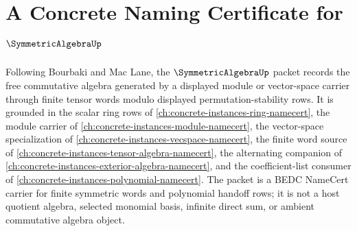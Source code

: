 \chapter{A Concrete Naming Certificate for $\SymmetricAlgebraUp$}
\label{ch:concrete-instances-symmetric-algebra-namecert}

Following Bourbaki and Mac Lane, the $\SymmetricAlgebraUp$ packet records the free commutative algebra generated by a displayed module or vector-space carrier through finite tensor words modulo displayed permutation-stability rows. It is grounded in the scalar ring rows of \autoref{ch:concrete-instances-ring-namecert}, the module carrier of \autoref{ch:concrete-instances-module-namecert}, the vector-space specialization of \autoref{ch:concrete-instances-vecspace-namecert}, the finite word source of \autoref{ch:concrete-instances-tensor-algebra-namecert}, the alternating companion of \autoref{ch:concrete-instances-exterior-algebra-namecert}, and the coefficient-list consumer of \autoref{ch:concrete-instances-polynomial-namecert}. The packet is a BEDC NameCert carrier for finite symmetric words and polynomial handoff rows; it is not a host quotient algebra, selected monomial basis, infinite direct sum, or ambient commutative algebra object.

